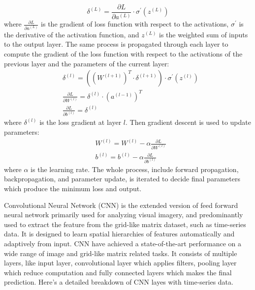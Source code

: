 \documentclass[12pt,a4paper,english
]{tunithesis}
\begin{document}
\begin{equation}
    \delta^{(L)}=\frac{\partial L}{\partial a^{(L)}} \cdot \sigma^{\prime}\left(z^{(L)}\right)
\end{equation}
where $\frac{\partial L}{\partial a^{(L)}}$ is the gradient of loss function with respect to the activations, $\sigma^{\prime}$ is the derivative of the activation function, and $z^{(L)}$ is the weighted sum of inputs to the output layer. The same process is propagated through each layer to compute the gradient of the loss function with respect to the activations of the previous layer and the parameters of the current layer:
\begin{equation}
    \begin{aligned}
& \delta^{(l)}=\left(\left(W^{(l+1)}\right)^T \cdot \delta^{(l+1)}\right) \cdot \sigma^{\prime}\left(z^{(l)}\right) \\
& \frac{\partial L}{\partial W^{(l)}}=\delta^{(l)} \cdot\left(a^{(l-1)}\right)^T \\
& \frac{\partial L}{\partial b^{(l)}}=\delta^{(l)}
\end{aligned}
\end{equation}
where $\delta^{(l)}$ is the loss gradient at layer $l$. Then gradient descent is used to update parameters:
\begin{equation}
    \begin{aligned}
& W^{(l)}=W^{(l)}-\alpha \frac{\partial L}{\partial W^{(l)}} \\
& b^{(l)}=b^{(l)}-\alpha \frac{\partial L}{\partial b^{(l)}}
\end{aligned}
\end{equation}
where $\alpha$ is the learning rate. The whole process, include forward propagation, backpropagation, and parameter update, is iterated to decide final parameters which produce the minimum loss and output.

Convolutional Neural Network (CNN) is the extended version of feed forward neural network primarily used for analyzing visual imagery, and predominantly used to extract the feature from the grid-like matrix dataset, such as time-series data. It is designed to learn spatial hierarchies of features automatically and adaptively from input. CNN have achieved a state-of-the-art performance on a wide range of image and grid-like matrix related tasks. It consists of multiple layers, like input layer, convolutional layer which applies filters, pooling layer which reduce computation and fully connected layers which makes the final prediction. Here's a detailed breakdown of CNN layes with time-series data.
\end{document}
